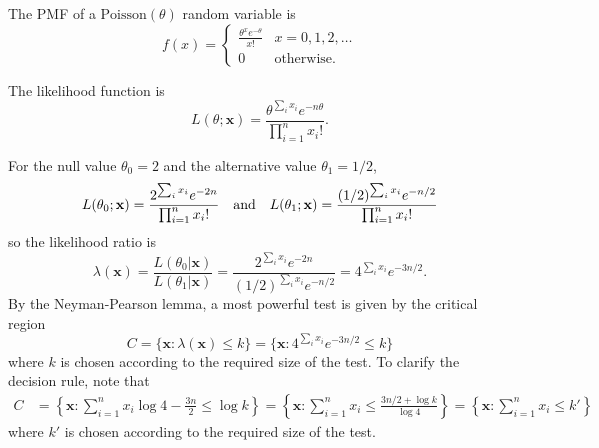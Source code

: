 \begin{solution}
The PMF of a $\text{Poisson}(\theta)$ random variable is
\[
f(x) = \begin{cases}
\displaystyle\frac{\theta^{x} e^{-\theta}}{x!}		& x=0,1,2,\ldots \\
0														& \text{otherwise.}
\end{cases}
\]

The likelihood function is
\[
L(\theta;\mathbf{x}) = \frac{\theta^{\sum_i x_i } e^{-n\theta}}{\prod_{i=1}^n x_i!}.
\]

For the null value $\theta_0=2$ and the alternative value $\theta_1=1/2$, 
\[
L(\theta_0;\mathbf{x}) = \frac{2^{\sum_i x_i} e^{-2n}}{\prod_{i=1}^n x_i!} 
\text{\quad and\quad}
L(\theta_1;\mathbf{x}) = \frac{(1/2)^{\sum_i x_i} e^{-n/2}}{\prod_{i=1}^n x_i!} 
\]
so the likelihood ratio is
\[
\lambda(\mathbf{x})
	= \frac{L(\theta_0|\mathbf{x})}{L(\theta_1|\mathbf{x})} 
	= \frac{2^{\sum_i x_i} e^{-2n}}{(1/2)^{\sum_i x_i} e^{-n/2}}
	= 4^{\sum_i x_i} e^{-3n/2}.
\]
By the Neyman-Pearson lemma, a most powerful test is given by the critical region
\[
C = \{\mathbf{x}:\lambda(\mathbf{x})\leq k\} = \{\mathbf{x}:4^{\sum_i x_i} e^{-3n/2}\leq k\}
\]
where $k$ is chosen according to the required size of the test.
%
To clarify the decision rule, note that
\begin{align*}
C 
	& = \left\{\mathbf{x}: \sum_{i=1}^n x_i\log 4 - \frac{3n}{2} \leq \log k\right\} 
	= \left\{\mathbf{x}: \sum_{i=1}^n x_i \leq \frac{3n/2 + \log k}{\log 4}\right\} 
	= \left\{\mathbf{x}: \sum_{i=1}^n x_i \leq k'\right\}
\end{align*}
where $k'$ is chosen according to the required size of the test.
\end{solution}


